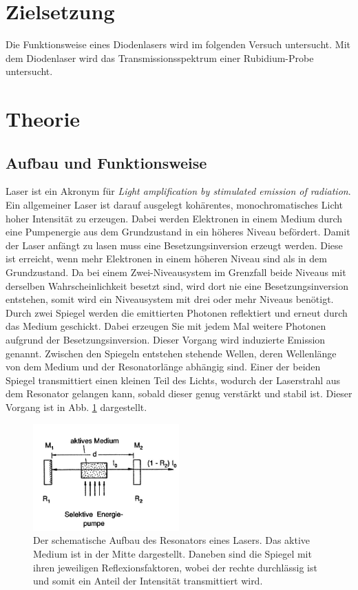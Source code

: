 \section{Zielsetzung}

Die Funktionsweise eines Diodenlasers wird im folgenden Versuch untersucht. Mit dem Diodenlaser wird das Transmissionsspektrum einer Rubidium-Probe untersucht. 

\section{Theorie}

\subsection{Aufbau und Funktionsweise}
Laser ist ein Akronym für \textit{Light amplification by stimulated emission of radiation}.
Ein allgemeiner Laser ist darauf ausgelegt kohärentes, monochromatisches Licht hoher Intensität zu erzeugen. Dabei werden Elektronen in einem Medium durch eine Pumpenergie aus dem Grundzustand in ein höheres Niveau befördert. Damit der Laser anfängt zu lasen muss eine Besetzungsinversion erzeugt werden. Diese ist erreicht, wenn mehr Elektronen in einem höheren Niveau sind als in dem Grundzustand. Da bei einem Zwei-Niveausystem im Grenzfall beide Niveaus mit derselben Wahrscheinlichkeit besetzt sind, wird dort nie eine Besetzungsinversion entstehen, somit wird ein Niveausystem mit drei oder mehr Niveaus benötigt. Durch zwei Spiegel werden die emittierten Photonen reflektiert und erneut durch das Medium geschickt. Dabei erzeugen Sie mit jedem Mal weitere Photonen aufgrund der Besetzungsinversion. Dieser Vorgang wird induzierte Emission genannt. Zwischen den Spiegeln entstehen stehende Wellen, deren Wellenlänge von dem Medium und der Resonatorlänge abhängig sind. 
Einer der beiden Spiegel transmittiert einen kleinen Teil des Lichts, wodurch der Laserstrahl aus dem Resonator gelangen kann, sobald dieser genug verstärkt und stabil ist. Dieser Vorgang ist in Abb. \ref{abb:laser} dargestellt.

\begin{figure}
    \centering
    \includegraphics[width=0.5\textwidth]{pics/demtroeder.jpg}
    \caption{Der schematische Aufbau des Resonators eines Lasers. Das aktive Medium ist in der Mitte dargestellt. Daneben sind die Spiegel mit ihren jeweiligen Reflexionsfaktoren, wobei der rechte durchlässig ist und somit ein Anteil der Intensität transmittiert wird. \cite{demtroeder}}
    \label{abb:laser}
\end{figure}


